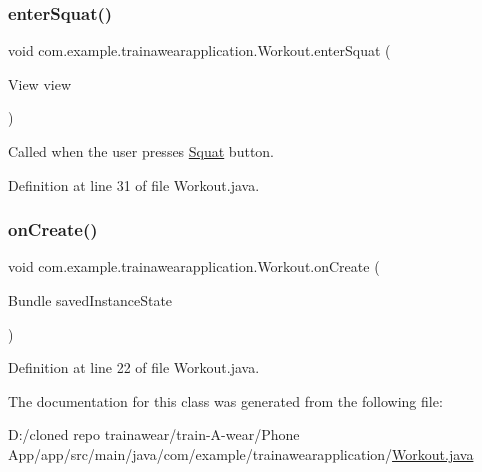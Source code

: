 \subsubsection{\texorpdfstring{enterSquat()}{enterSquat()}}
{\footnotesize\ttfamily void com.\+example.\+trainawearapplication.\+Workout.\+enter\+Squat (\begin{DoxyParamCaption}\item[{View}]{view }\end{DoxyParamCaption})}



Called when the user presses \mbox{\hyperlink{classcom_1_1example_1_1trainawearapplication_1_1_squat}{Squat}} button. 



Definition at line 31 of file Workout.\+java.


\begin{DoxyCode}{0}

\end{DoxyCode}
\mbox{\label{classcom_1_1example_1_1trainawearapplication_1_1_workout_a1a8beb733b991b8fc2b0844d77b2caa6}} 
\subsubsection{\texorpdfstring{onCreate()}{onCreate()}}
{\footnotesize\ttfamily void com.\+example.\+trainawearapplication.\+Workout.\+on\+Create (\begin{DoxyParamCaption}\item[{Bundle}]{saved\+Instance\+State }\end{DoxyParamCaption})\hspace{0.3cm}{\ttfamily [protected]}}



Definition at line 22 of file Workout.\+java.


\begin{DoxyCode}{0}

\end{DoxyCode}


The documentation for this class was generated from the following file\+:\begin{DoxyCompactItemize}
\item 
D\+:/cloned repo trainawear/train-\/\+A-\/wear/\+Phone App/app/src/main/java/com/example/trainawearapplication/\mbox{\hyperlink{_workout_8java}{Workout.\+java}}\end{DoxyCompactItemize}

